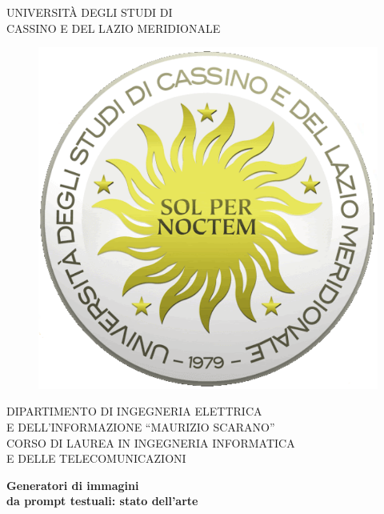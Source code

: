 
\thispagestyle{empty}

\begin{center}
    \Large{UNIVERSITÀ DEGLI STUDI DI \\ CASSINO E DEL LAZIO MERIDIONALE}
\end{center}

\begin{figure}[!htp]
    \centering
    \includegraphics[keepaspectratio=true,scale=0.25]{Images/Frontespizio/Unicas_logo.pdf}
\end{figure}

\begin{center}
    \normalsize{DIPARTIMENTO DI INGEGNERIA ELETTRICA \\ E DELL'INFORMAZIONE “MAURIZIO SCARANO”}
    \vspace{4mm}
    \\ \normalsize{CORSO DI LAUREA IN INGEGNERIA INFORMATICA \\ E DELLE TELECOMUNICAZIONI}
\end{center}


\vspace{7mm}


\begin{center}
    \LARGE{\textbf{Generatori di immagini \\ da prompt testuali: stato dell'arte}}
\end{center}


